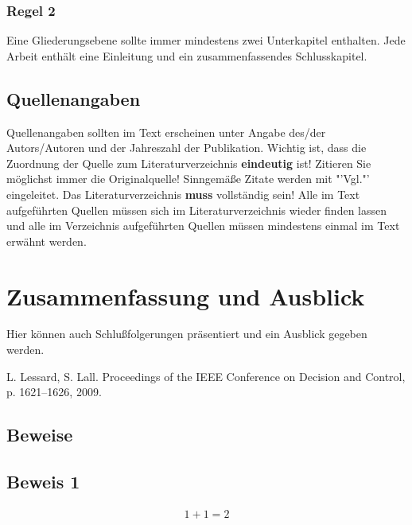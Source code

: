 \documentclass[12pt]{article}
\begin{document}
\subsubsection{Regel 2}
Eine Gliederungsebene sollte immer mindestens zwei Unterkapitel enthalten. Jede Arbeit enthält eine Einleitung und ein zusammenfassendes Schlusskapitel.

\subsection{Quellenangaben}
Quellenangaben sollten im Text erscheinen unter Angabe des/der Autors/Autoren und der Jahreszahl der Publikation. Wichtig ist, dass die Zuordnung der Quelle zum Literaturverzeichnis \textbf{eindeutig} ist! Zitieren Sie möglichst immer die Originalquelle! Sinngemäße Zitate werden mit "'Vgl."' eingeleitet. Das Literaturverzeichnis \textbf{muss} vollständig sein! Alle im Text aufgeführten Quellen müssen sich im Literaturverzeichnis wieder finden lassen und alle im Verzeichnis aufgeführten Quellen müssen mindestens einmal im Text erwähnt werden.

\section{Zusammenfassung und Ausblick}%

Hier können auch Schlußfolgerungen präsentiert und ein Ausblick gegeben werden.

\newpage
\newpage{}
\setcounter{page}{5}

\begin{thebibliography}{99} 

 L. Lessard, S. Lall.
  Proceedings of the IEEE Conference on Decision and Control, p. 1621--1626, 2009.



\end{thebibliography}



\newpage\clearpage
{}
\begin{appendix}
\section{Beweise}
\subsection{Beweis 1}
\begin{eqnarray}
1+1 = 2
\end{eqnarray}
\end{appendix}
\end{document}
